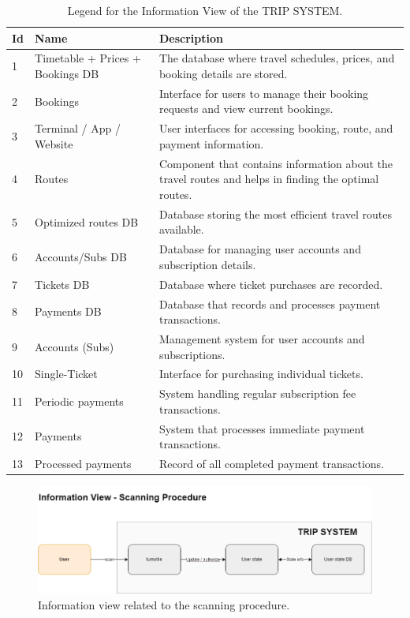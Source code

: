 \begin{table}[H]
    \centering
    \caption{Legend for the Information View of the TRIP SYSTEM.}
    \label{tab:information_view_legend}
    \begin{tabular}{@{}llp{10cm}@{}}
    \toprule
    \textbf{Id} & \textbf{Name} & \textbf{Description} \\
    \midrule
    1 & Timetable + Prices + Bookings DB & The database where travel schedules, prices, and booking details are stored. \\
    2 & Bookings & Interface for users to manage their booking requests and view current bookings. \\
    3 & Terminal / App / Website & User interfaces for accessing booking, route, and payment information. \\
    4 & Routes & Component that contains information about the travel routes and helps in finding the optimal routes. \\
    5 & Optimized routes DB & Database storing the most efficient travel routes available. \\
    6 & Accounts/Subs DB & Database for managing user accounts and subscription details. \\
    7 & Tickets DB & Database where ticket purchases are recorded. \\
    8 & Payments DB & Database that records and processes payment transactions. \\
    9 & Accounts (Subs) & Management system for user accounts and subscriptions. \\
    10 & Single-Ticket & Interface for purchasing individual tickets. \\
    11 & Periodic payments & System handling regular subscription fee transactions. \\
    12 & Payments & System that processes immediate payment transactions. \\
    13 & Processed payments & Record of all completed payment transactions. \\
    \bottomrule
\end{tabular}
\end{table}

\begin{figure}[H]
    \centering
    \includegraphics[width=\textwidth]{drawings/views_draft3/information_view scanning.png}
    \caption{Information view related to the scanning procedure.}
    \label{fig:information_view_scanning}
\end{figure}

